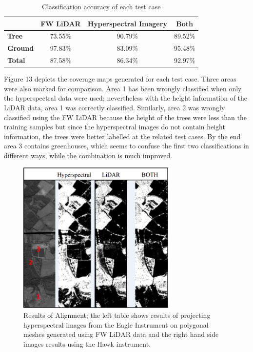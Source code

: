 \documentclass{subfiles}
\begin{document}
\begin{table}[!htbp]

	\label{tab:CoverageResults}
	\centering
\begin{tabular}{| l || c | c | c| }
	\hline		
	& \textbf{FW LiDAR} & \textbf{Hyperspectral Imagery} & \textbf{Both} \\	
	\hline			
	\hline			
	\textbf{Tree} & 73.55\% & 90.79\% & 89.52\% \\
	\hline			
	\textbf{Ground} & 97.83\% & 83.09\% & 95.48\% \\
	\hline			
	\textbf{Total} & 87.58\% & 86.34\% &92.97\% \\
	\hline  
\end{tabular}
	\caption{ Classification accuracy of each test case}
\end{table}


\par Figure 13 depicts the coverage maps generated for each test case. Three areas were also marked for comparison. Area 1 has been wrongly classified when only the hyperspectral data were used; nevertheless with the height information of the LiDAR
data, area 1 was correctly classified. Similarly, area 2 was wrongly classified using the FW LiDAR because the height of the trees were less than the training samples but since the hyperspectral images do not contain height information, the
trees were better labelled at the related test cases. By the end area 3 contains greenhouses, which seems to confuse the first two classifications in different ways, while the combination is much improved. 


\begin{figure} [h!]
	\centering
	\includegraphics[width=0.7\textwidth]{img/CoverageResults}
	\caption[Results of Alignement]{Results of Alignment; the left table shows results of projecting hyperspectral images from the Eagle Instrument on polygonal meshes generated using FW LiDAR data and the right hand side images results using the Hawk instrument.}
	\label{fig:CoverageResults}
\end{figure}
\end{document}
